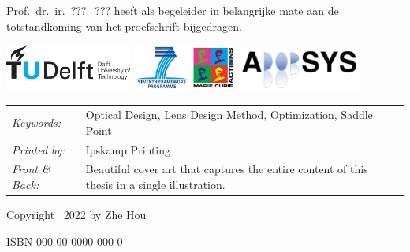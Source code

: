 \begin{titlepage}
\medskip
\noindent Prof.\ dr.\ ir.\ ???.\ ??? heeft als begeleider in belangrijke mate aan de totstandkoming van het proefschrift bijgedragen.

\vfill
\begin{center}
    \includegraphics[height=0.6in]{title/logos/tudelftpng}
    \hspace{2em}
    \includegraphics[height=0.6in]{title/logos/marie-curie}
    \hspace{2em}
    \includegraphics[height=0.55in]{title/logos/adopsys}
\end{center}
\vfill

\noindent
\begin{tabular}{@{}p{}@{}p{}}
    \textit{Keywords:} & Optical Design, Lens Design Method, Optimization, Saddle Point \\[\medskipamount]
    \textit{Printed by:} & Ipskamp Printing \\[\medskipamount]
    \textit{Front \& Back:} & Beautiful cover art that captures the entire content of this thesis in a single illustration.
\end{tabular}

\vspace{4\bigskipamount}

\noindent Copyright \textcopyright\ 2022 by Zhe Hou


\medskip
\noindent ISBN 000-00-0000-000-0


\end{titlepage}
